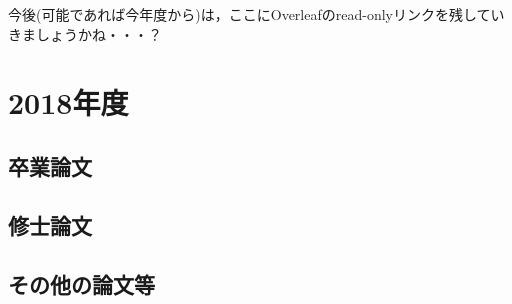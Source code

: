 \documentclass[dvipdfmx,autodetect-engine]{jsreport}
\begin{document}
今後(可能であれば今年度から)は，ここにOverleafのread-onlyリンクを残していきましょうかね・・・？

\section{2018年度}

\subsection{卒業論文}

\subsection{修士論文}

\subsection{その他の論文等}
\end{document}
